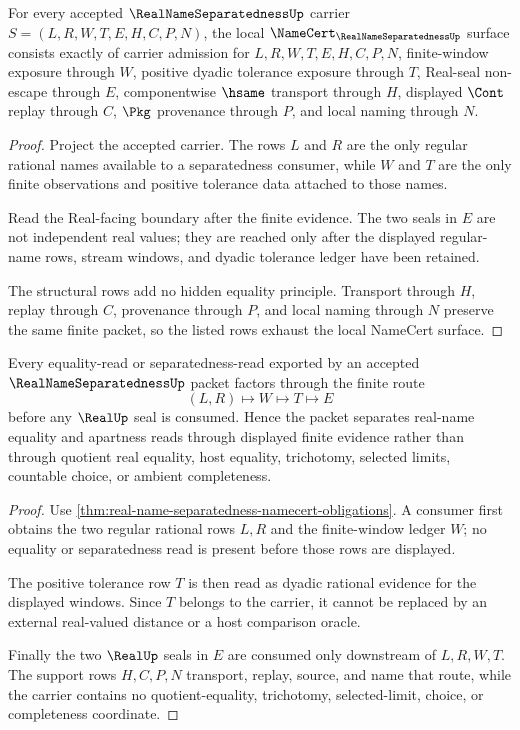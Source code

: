 \begin{theorem}
\label{thm:real-name-separatedness-namecert-obligations}
For every accepted $\RealNameSeparatednessUp$ carrier $S=(L,R,W,T,E,H,C,P,N)$, the local $\NameCert_{\RealNameSeparatednessUp}$ surface consists exactly of carrier admission for $L,R,W,T,E,H,C,P,N$, finite-window exposure through $W$, positive dyadic tolerance exposure through $T$, Real-seal non-escape through $E$, componentwise $\hsame$ transport through $H$, displayed $\Cont$ replay through $C$, $\Pkg$ provenance through $P$, and local naming through $N$.
\end{theorem}
\begin{proof}
Project the accepted carrier. The rows $L$ and $R$ are the only regular rational names available to a separatedness consumer, while $W$ and $T$ are the only finite observations and positive tolerance data attached to those names.

Read the Real-facing boundary after the finite evidence. The two seals in $E$ are not independent real values; they are reached only after the displayed regular-name rows, stream windows, and dyadic tolerance ledger have been retained.

The structural rows add no hidden equality principle. Transport through $H$, replay through $C$, provenance through $P$, and local naming through $N$ preserve the same finite packet, so the listed rows exhaust the local NameCert surface.
\end{proof}

\begin{theorem}
\label{thm:real-name-separatedness-finite-window-route}
Every equality-read or separatedness-read exported by an accepted $\RealNameSeparatednessUp$ packet factors through the finite route
$$
(L,R)\longmapsto W\longmapsto T\longmapsto E
$$
before any $\RealUp$ seal is consumed. Hence the packet separates real-name equality and apartness reads through displayed finite evidence rather than through quotient real equality, host equality, trichotomy, selected limits, countable choice, or ambient completeness.
\end{theorem}
\begin{proof}
Use \autoref{thm:real-name-separatedness-namecert-obligations}. A consumer first obtains the two regular rational rows $L,R$ and the finite-window ledger $W$; no equality or separatedness read is present before those rows are displayed.

The positive tolerance row $T$ is then read as dyadic rational evidence for the displayed windows. Since $T$ belongs to the carrier, it cannot be replaced by an external real-valued distance or a host comparison oracle.

Finally the two $\RealUp$ seals in $E$ are consumed only downstream of $L,R,W,T$. The support rows $H,C,P,N$ transport, replay, source, and name that route, while the carrier contains no quotient-equality, trichotomy, selected-limit, choice, or completeness coordinate.
\end{proof}

